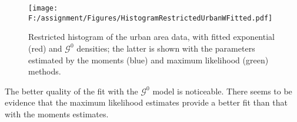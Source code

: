 \documentclass{article}
\begin{document}
\begin{figure}[hbt]
\centering
\texttt{[image: F:/assignment/Figures/HistogramRestrictedUrbanWFitted.pdf]}
\caption{Restricted histogram of the urban area data, with fitted exponential (red) and $\mathcal G^0$ densities; the latter is shown with the parameters estimated by the moments (blue) and maximum likelihood (green) methods.}
\end{figure}
The better quality of the fit with the $\mathcal G^0$ model is noticeable.
There seems to be evidence that the maximum likelihood estimates provide a better fit than that with the moments estimates.

\pagebreak

\end{document}

